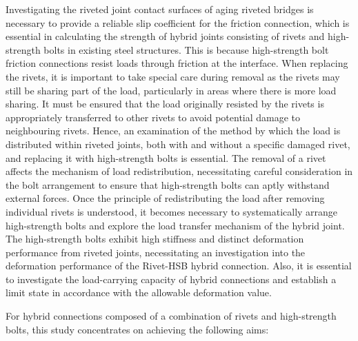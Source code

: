 Investigating the riveted joint contact surfaces of aging riveted bridges is necessary to provide a reliable slip coefficient for the friction connection, which is essential in calculating the strength of hybrid joints consisting of rivets and high-strength bolts in existing steel structures. This is because high-strength bolt friction connections resist loads through friction at the interface. When replacing the rivets, it is important to take special care during removal as the rivets may still be sharing part of the load, particularly in areas where there is more load sharing. It must be ensured that the load originally resisted by the rivets is appropriately transferred to other rivets to avoid potential damage to neighbouring rivets. Hence, an examination of the method by which the load is distributed within riveted joints, both with and without a specific damaged rivet, and replacing it with high-strength bolts is essential. The removal of a rivet affects the mechanism of load redistribution, necessitating careful consideration in the bolt arrangement to ensure that high-strength bolts can aptly withstand external forces.  Once the principle of redistributing the load after removing individual rivets is understood, it becomes necessary to systematically arrange high-strength bolts and explore the load transfer mechanism of the hybrid joint. The high-strength bolts exhibit high stiffness and distinct deformation performance from riveted joints, necessitating an investigation into the deformation performance of the Rivet-HSB hybrid connection. Also, it is essential to investigate the load-carrying capacity of hybrid connections and establish a limit state in accordance with the allowable deformation value.

For hybrid connections composed of a combination of rivets and high-strength bolts, this study concentrates on achieving the following aims:

